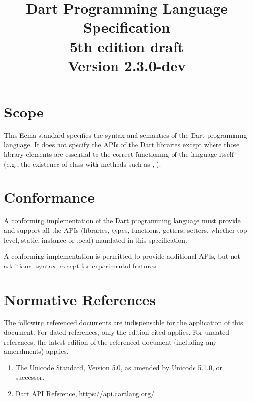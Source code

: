 \documentclass[makeidx]{article}
\title{Dart Programming Language Specification\\
{5th edition draft}\\
{\large Version 2.3.0-dev}}
\author{}
\begin{document}
\maketitle
\tableofcontents

\newpage

\pagestyle{myheadings}


\section{Scope}

\LMHash{}%
This Ecma standard specifies the syntax and semantics of the Dart programming language.
It does not specify the APIs of the Dart libraries except where those library elements are essential to the correct functioning of the language itself (e.g., the existence of class  with methods such as , ).


\section{Conformance}

\LMHash{}%
A conforming implementation of the Dart programming language must provide and support all the APIs (libraries, types, functions, getters, setters, whether top-level, static, instance or local) mandated in this specification.

\LMHash{}%
A conforming implementation is permitted to provide additional APIs,
but not additional syntax,
except for experimental features.


\section{Normative References}

\LMHash{}%
The following referenced documents are indispensable for the application of this document.
For dated references, only the edition cited applies.
For undated references, the latest edition of the referenced document (including any amendments) applies.

\begin{enumerate}
\item
  The Unicode Standard, Version 5.0, as amended by Unicode 5.1.0, or successor.
\item
  Dart API Reference, https://api.dartlang.org/
\end{enumerate}
\end{document}
